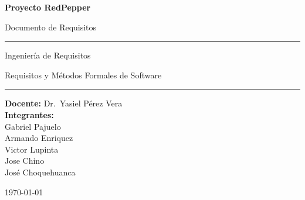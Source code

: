\documentclass[11pt,spanish]{article}
\begin{document}
\begin{titlepage}
  \centering
  \vspace*{2.0cm}

  {\Huge\bfseries Proyecto RedPepper\par}
  \vspace{0.6cm}
  {\LARGE Documento de Requisitos\par}

  \vspace{2.2cm}
  \rule{\linewidth}{0.4pt}\par
  \vspace{0.6cm}
  {\large Ingeniería de Requisitos\par}
  {\large Requisitos y Métodos Formales de Software\par}
  \vspace{0.6cm}
  \rule{\linewidth}{0.4pt}\par

  \vfill

  \begin{minipage}{0.82\linewidth}
    \centering
    \textbf{Docente:} Dr.\ Yasiel Pérez Vera\\[0.8em]
    \textbf{Integrantes:}\\[0.3em]
    Gabriel Pajuelo\\
    Armando Enriquez\\
    Victor Lupinta\\
    Jose Chino\\
    José Choquehuanca
  \end{minipage}

  \vfill

  {\large \today\par}
\end{titlepage}

\tableofcontents
\newpage





\end{document}
